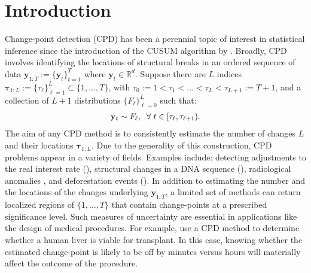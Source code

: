 \section{Introduction}
\label{sec:intro}

Change-point detection (CPD) has been a perennial topic of interest in statistical inference since the introduction of the CUSUM algorithm by \cite{Page54}. Broadly, CPD involves identifying the locations of structural breaks in an ordered sequence of data $\mathbf{y}_{1:T}:= \{\mathbf{y}_t\}_{t=1}^T$ where $\mathbf{y}_t \in \mathbb{R}^d$. Suppose there are $L$ indices $\boldsymbol{\tau}_{1:L}:=\{\tau_\ell\}_{\ell=1}^{L} \subset \{1,\ldots,T\}$, with $\tau_0:=1 < \tau_1 < \ldots< \tau_L < \tau_{L+1} := T+1$, and a collection of $L+1$ distributions $\{F_\ell\}_{\ell=0}^L$ such that:
\begin{align}\label{eq:cdp-def}
    \mathbf{y}_t \sim F_\ell, \;\;\forall\; t \in [\tau_\ell,\tau_{\ell+1}).
\end{align}
The aim of any CPD method is to consistently estimate the number of changes $L$ and their locations $\boldsymbol{\tau}_{1:L}$. Due to the generality of this construction, CPD problems appear in a variety of fields. Examples include: detecting adjustments to the real interest rate (\citealp{Bai03}), structural changes in a DNA sequence (\citealp{Muggeo11}), radiological anomalies \citep{madrid2019sequential}, and deforestation events (\citealp{Wendelberger21}). In addition to estimating the number and the locations of the changes underlying $\mathbf{y}_{1:T}$, a limited set of methods can return localized regions of $\{1,\ldots,T\}$ that contain change-points at a prescribed significance level. Such measures of uncertainty are essential in applications like the design of medical procedures. For example, \cite{Gao19} use a CPD method to determine whether a human liver is viable for transplant. In this case, knowing whether the estimated change-point is likely to be off by minutes versus hours will materially affect the outcome of the procedure. 

